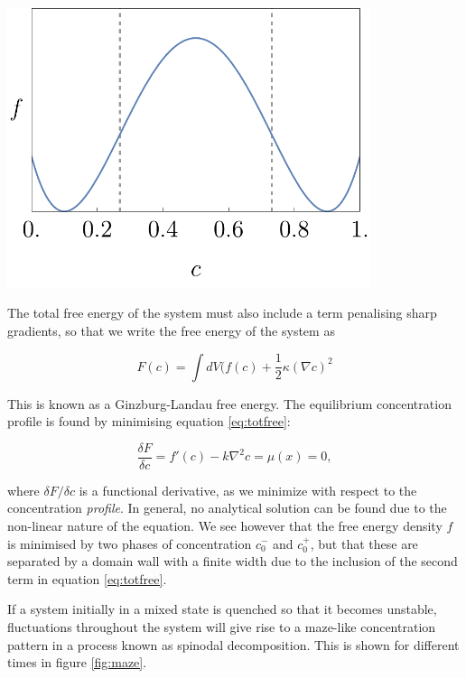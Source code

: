 \documentclass{Dissertate}
\let\origfigure\figure
\let\endorigfigure\endfigure
\renewenvironment{figure}[1][2] {
    \expandafter\origfigure\expandafter[H]
} {
    \endorigfigure
}
\begin{document}
\begin{figure}
	\centering
	\includegraphics[width=0.8\textwidth]{source/figures/pdf/Freeenergydensity.pdf}
	\caption{Phenomenological free energy density with minima at $c_0^-$ and $c_0^+$.}
	\label{fig:freeenergy}
\end{figure}

The total free energy of the system must also include a term penalising sharp gradients, so that we write the free energy of the system as 

\begin{equation}
	\label{eq:totfree}
	F(c) = \int dV (f(c)+\frac{1}{2}\kappa (\nabla c)^2
\end{equation}

This is known as a Ginzburg-Landau free energy. The equilibrium concentration profile is found by minimising equation \ref{eq:totfree}:

\begin{equation}
\frac{\delta F}{\delta c} = f'(c)-k\nabla^2c=\mu(x) =0,
\label{eq:euler}\end{equation}

where \(\delta F/\delta c\) is a functional derivative, as we minimize
with respect to the concentration \emph{profile}. In general, no analytical solution can be found due to the non-linear nature of the equation. We see however that the free energy density $f$ is minimised by two phases of concentration $c_0^-$ and $c_0^+$, but that these are separated by a domain wall with a finite width due to the inclusion of the second term in equation \ref{eq:totfree}.

If a system initially in a mixed state is quenched so that it becomes unstable, fluctuations throughout the system will give rise to a maze-like concentration pattern in a process known as spinodal decomposition. This is shown for different times in figure \ref{fig:maze}.
\end{document}
